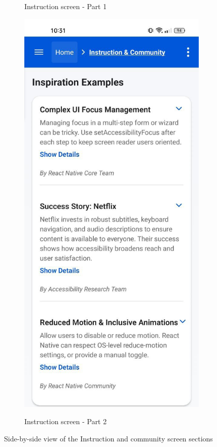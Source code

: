 \begin{figure}[ht]
\begin{subfigure}[b]{0.48\textwidth}
        \caption{Instruction screen - Part 1}
        \label{fig:instruction-left}
    \end{subfigure}
    \hfill
    \begin{subfigure}[b]{0.48\textwidth}
        \centering
        \includegraphics[width=\linewidth, alt={Second part of the Instruction and community screen}]{img/instruction2.jpg}
        \caption{Instruction screen - Part 2}
        \label{fig:instruction-right}
    \end{subfigure}
    \caption{Side-by-side view of the Instruction and community screen sections}
    \label{fig:instruction_screens_sidebyside}
\end{figure}

